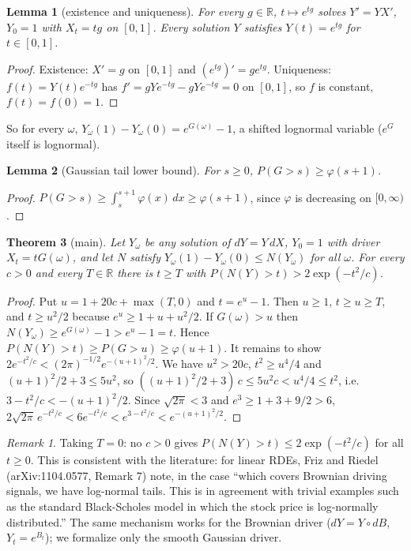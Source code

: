 \documentclass[11pt]{article}
\newtheorem{theorem}{Theorem}
\newtheorem{lemma}[theorem]{Lemma}
\theoremstyle{remark}
\newtheorem{remark}{Remark}
\begin{document}
\begin{lemma}[existence and uniqueness]
For every $g \in \mathbb{R}$, $t \mapsto e^{tg}$ solves $Y' = Y X'$, $Y_0 = 1$ with
$X_t = tg$ on $[0,1]$. Every solution $Y$ satisfies $Y(t) = e^{tg}$ for $t \in [0,1]$.
\end{lemma}
\begin{proof}
Existence: $X' = g$ on $[0,1]$ and $(e^{tg})' = g e^{tg}$. Uniqueness: $f(t) = Y(t)e^{-tg}$ has
$f' = gYe^{-tg} - gYe^{-tg} = 0$ on $[0,1]$, so $f$ is constant, $f(t) = f(0) = 1$.
\end{proof}

So for every $\omega$, $Y_\omega(1) - Y_\omega(0) = e^{G(\omega)} - 1$, a shifted lognormal variable ($e^{G}$ itself is lognormal).

\begin{lemma}[Gaussian tail lower bound]
For $s \ge 0$, $P(G > s) \ge \varphi(s+1)$.
\end{lemma}
\begin{proof}
$P(G > s) \ge \int_{s}^{s+1}\varphi(x)\,dx \ge \varphi(s+1)$, since $\varphi$ is decreasing on
$[0,\infty)$.
\end{proof}

\begin{theorem}[main]
Let $Y_\omega$ be any solution of $dY = Y\,dX$, $Y_0 = 1$ with driver $X_t = tG(\omega)$, and let
$N$ satisfy $Y_\omega(1) - Y_\omega(0) \le N(Y_\omega)$ for all $\omega$. For every $c > 0$ and every
$T \in \mathbb{R}$ there is $t \ge T$ with $P(N(Y) > t) > 2\exp(-t^2/c)$.
\end{theorem}
\begin{proof}
Put $u = 1 + 20c + \max(T,0)$ and $t = e^u - 1$. Then $u \ge 1$, $t \ge u \ge T$, and
$t \ge u^2/2$ because $e^u \ge 1 + u + u^2/2$. If $G(\omega) > u$ then
$N(Y_\omega) \ge e^{G(\omega)} - 1 > e^u - 1 = t$. Hence
$P(N(Y) > t) \ge P(G > u) \ge \varphi(u+1)$. It remains to show
$2e^{-t^2/c} < (2\pi)^{-1/2}e^{-(u+1)^2/2}$. We have $u^2 > 20c$, $t^2 \ge u^4/4$ and
$(u+1)^2/2 + 3 \le 5u^2$, so
$((u+1)^2/2 + 3)\,c \le 5u^2 c < u^4/4 \le t^2$, i.e.\ $3 - t^2/c < -(u+1)^2/2$. Since
$\sqrt{2\pi} < 3$ and $e^3 \ge 1 + 3 + 9/2 > 6$,
$2\sqrt{2\pi}\,e^{-t^2/c} < 6e^{-t^2/c} < e^{3 - t^2/c} < e^{-(u+1)^2/2}$.
\end{proof}

\begin{remark}
Taking $T = 0$: no $c > 0$ gives $P(N(Y) > t) \le 2\exp(-t^2/c)$ for all $t \ge 0$. This is
consistent with the literature: for linear RDEs, Friz and Riedel (arXiv:1104.0577, Remark 7) note,
in the case ``which covers Brownian driving signals, we have log-normal tails. This is in agreement
with trivial examples such as the standard Black-Scholes model in which the stock price is
log-normally distributed.'' The same mechanism works for the Brownian driver
($dY = Y\circ dB$, $Y_t = e^{B_t}$); we formalize only the smooth Gaussian driver.
\end{remark}
\end{document}
